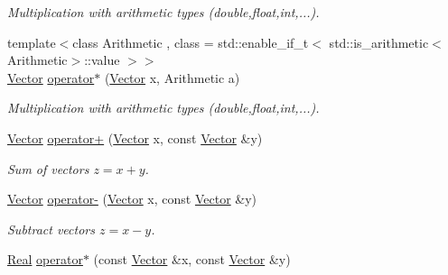 \begin{DoxyCompactItemize}
\begin{DoxyCompactList}\small\item\em Multiplication with arithmetic types (double,float,int,...). \end{DoxyCompactList}\item 
\hypertarget{namespaceSpacy_a0120fd6b1d7580a9f7b8f24e646cbc6c}{}{\footnotesize template$<$class Arithmetic , class  = std\+::enable\+\_\+if\+\_\+t$<$ std\+::is\+\_\+arithmetic$<$\+Arithmetic$>$\+::value $>$$>$ }\\\hyperlink{classSpacy_1_1Vector}{Vector} \hyperlink{namespaceSpacy_a0120fd6b1d7580a9f7b8f24e646cbc6c}{operator$\ast$} (\hyperlink{classSpacy_1_1Vector}{Vector} x, Arithmetic a)\label{namespaceSpacy_a0120fd6b1d7580a9f7b8f24e646cbc6c}

\begin{DoxyCompactList}\small\item\em Multiplication with arithmetic types (double,float,int,...). \end{DoxyCompactList}\item 
\hypertarget{namespaceSpacy_a19486acb05af1627ec49c376b204a61c}{}\hyperlink{classSpacy_1_1Vector}{Vector} \hyperlink{namespaceSpacy_a19486acb05af1627ec49c376b204a61c}{operator+} (\hyperlink{classSpacy_1_1Vector}{Vector} x, const \hyperlink{classSpacy_1_1Vector}{Vector} \&y)\label{namespaceSpacy_a19486acb05af1627ec49c376b204a61c}

\begin{DoxyCompactList}\small\item\em Sum of vectors $z=x+y$. \end{DoxyCompactList}\item 
\hypertarget{namespaceSpacy_a9eaf4be1a4e8f3ee03e4c4fdafa5687d}{}\hyperlink{classSpacy_1_1Vector}{Vector} \hyperlink{namespaceSpacy_a9eaf4be1a4e8f3ee03e4c4fdafa5687d}{operator-\/} (\hyperlink{classSpacy_1_1Vector}{Vector} x, const \hyperlink{classSpacy_1_1Vector}{Vector} \&y)\label{namespaceSpacy_a9eaf4be1a4e8f3ee03e4c4fdafa5687d}

\begin{DoxyCompactList}\small\item\em Subtract vectors $z=x-y$. \end{DoxyCompactList}\item 
\hypertarget{namespaceSpacy_a1d84603fc2bfbefca6a020b1217519ad}{}\hyperlink{classSpacy_1_1Real}{Real} \hyperlink{namespaceSpacy_a1d84603fc2bfbefca6a020b1217519ad}{operator$\ast$} (const \hyperlink{classSpacy_1_1Vector}{Vector} \&x, const \hyperlink{classSpacy_1_1Vector}{Vector} \&y)\label{namespaceSpacy_a1d84603fc2bfbefca6a020b1217519ad}


\end{DoxyCompactItemize}
